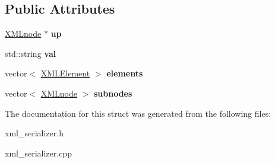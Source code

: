 \subsection*{Public Attributes}
\begin{DoxyCompactItemize}
\item 
\hyperlink{structXMLnode}{X\+M\+Lnode} $\ast$ {\bfseries up}\hypertarget{structXMLnode_a2bdfd1a38af0d2a1ea9001c80d569e48}{}\label{structXMLnode_a2bdfd1a38af0d2a1ea9001c80d569e48}

\item 
std\+::string {\bfseries val}\hypertarget{structXMLnode_a99d102c9781a90131e0d418c123f93b7}{}\label{structXMLnode_a99d102c9781a90131e0d418c123f93b7}

\item 
vector$<$ \hyperlink{structXMLElement}{X\+M\+L\+Element} $>$ {\bfseries elements}\hypertarget{structXMLnode_a65bb923d8a5a4626cf9ef4743682933f}{}\label{structXMLnode_a65bb923d8a5a4626cf9ef4743682933f}

\item 
vector$<$ \hyperlink{structXMLnode}{X\+M\+Lnode} $>$ {\bfseries subnodes}\hypertarget{structXMLnode_a7be3c5110badc10bd2e2b74c7e860197}{}\label{structXMLnode_a7be3c5110badc10bd2e2b74c7e860197}

\end{DoxyCompactItemize}


The documentation for this struct was generated from the following files\+:\begin{DoxyCompactItemize}
\item 
xml\+\_\+serializer.\+h\item 
xml\+\_\+serializer.\+cpp\end{DoxyCompactItemize}
